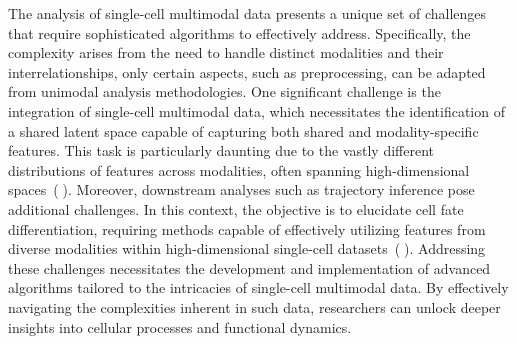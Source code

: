 The analysis of single-cell multimodal data presents a unique set of challenges that require sophisticated algorithms to effectively address. Specifically, the complexity arises from the need to handle distinct modalities and their interrelationships, only certain aspects, such as preprocessing, can be adapted from unimodal analysis methodologies. One significant challenge is the integration of single-cell multimodal data, which necessitates the identification of a shared latent space capable of capturing both shared and modality-specific features. This task is particularly daunting due to the vastly different distributions of features across modalities, often spanning high-dimensional spaces~(\textcircled{}). Moreover, downstream analyses such as trajectory inference pose additional challenges. In this context, the objective is to elucidate cell fate differentiation, requiring methods capable of effectively utilizing features from diverse modalities within high-dimensional single-cell datasets~(\textcircled{}). Addressing these challenges necessitates the development and implementation of advanced algorithms tailored to the intricacies of single-cell multimodal data. By effectively navigating the complexities inherent in such data, researchers can unlock deeper insights into cellular processes and functional dynamics.




 
